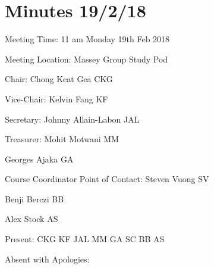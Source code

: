 \section{Minutes 19/2/18}\label{app:19-2}

\noindent Meeting Time: 11 am Monday 19th Feb 2018

\noindent Meeting Location: Massey Group Study Pod


\noindent \textbf{}

\noindent Chair: Chong Keat Gea CKG

\noindent Vice-Chair: Kelvin Fang KF

\noindent Secretary: Johnny Allain-Labon JAL

\noindent Treasurer: Mohit Motwani MM

\noindent Georges Ajaka GA

\noindent Course Coordinator Point of Contact: Steven Vuong SV

\noindent Benji Berczi BB

\noindent Alex Stock AS

\noindent 

\noindent Present: CKG KF JAL MM GA SC BB AS

\noindent Absent with Apologies: 



